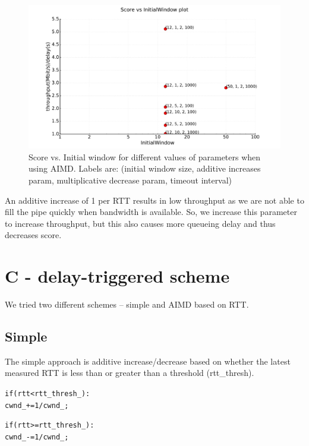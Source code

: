 \documentclass{article}
\begin{document}
\begin{figure}[h]
\includegraphics[width=\columnwidth]{"../B/aimd-score"}
\caption{Score vs. Initial window for different
values of parameters when using AIMD. Labels are: (initial window
size, additive increases param, multiplicative decrease param, timeout
interval)}
\label{aimd-score}
\end{figure}

An additive increase of 1 per RTT results in low throughput as we are
not able to fill the pipe quickly when bandwidth is available. So, we
increase this parameter to increase throughput, but this also causes
more queueing delay and thus decreases score.

\clearpage
\section{C - delay-triggered scheme}
We tried two different schemes -- simple and AIMD based on RTT.
\subsection{Simple}
The simple approach is additive increase/decrease based on whether the
latest measured RTT is less than or greater than a threshold
(rtt\_thresh).
\begin{alltt}
  if (rtt < rtt_thresh_):
    cwnd_ += 1/cwnd_;

  if (rtt >= rtt_thresh_):
      cwnd_ -= 1/cwnd_;
\end{alltt}
\end{document}
